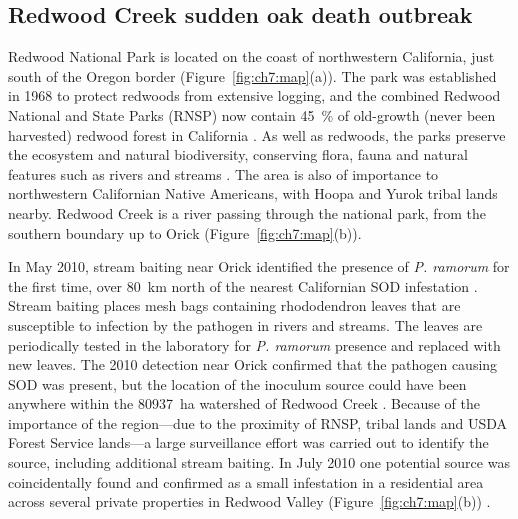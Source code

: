 \subsection{Redwood Creek sudden oak death outbreak}

Redwood National Park is located on the coast of northwestern California, just south of the Oregon border (Figure~\ref{fig:ch7:map}(a)). The park was established in 1968 to protect redwoods from extensive logging, and the combined Redwood National and State Parks (RNSP) now contain \SI{45}{\percent} of old-growth (never been harvested) redwood forest in California \citep{rnsp_website}. As well as redwoods, the parks preserve the ecosystem and natural biodiversity, conserving flora, fauna and natural features such as rivers and streams \citep{rnsp_website}. The area is also of importance to northwestern Californian Native Americans, with Hoopa and Yurok tribal lands nearby. Redwood Creek is a river passing through the national park, from the southern boundary up to Orick (Figure~\ref{fig:ch7:map}(b)).

In May 2010, stream baiting near Orick identified the presence of \emph{P. ramorum} for the first time, over \SI{80}{\km} north of the nearest Californian SOD infestation \citep{valachovic_novel_2013}. Stream baiting places mesh bags containing rhododendron leaves that are susceptible to infection by the pathogen in rivers and streams. The leaves are periodically tested in the laboratory for \emph{P. ramorum} presence and replaced with new leaves. The 2010 detection near Orick confirmed that the pathogen causing SOD was present, but the location of the inoculum source could have been anywhere within the \SI{80937}{\hectare} watershed of Redwood Creek \citep{valachovic_novel_2013}. Because of the importance of the region---due to the proximity of RNSP, tribal lands and USDA Forest Service lands---a large surveillance effort was carried out to identify the source, including additional stream baiting. In July 2010 one potential source was coincidentally found and confirmed as a small infestation in a residential area across several private properties in Redwood Valley (Figure~\ref{fig:ch7:map}(b)) \citep{valachovic_novel_2013}.

